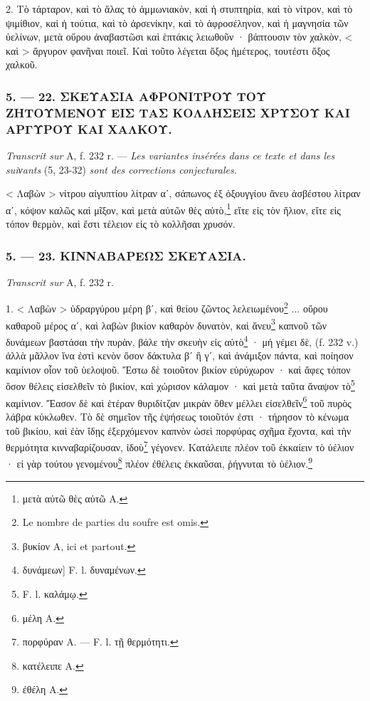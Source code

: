 \documentclass[a4paper, 11pt, oneside, polutonikogreek, french]{article}
\begin{document}
2. Τὸ τάρταρον, καὶ τὸ ἅλας τὸ ἀμμωνιακὸν, καὶ ἡ στυπτηρία, καὶ τὸ νίτρον, καὶ τὸ ψιμίθιον, καὶ ἡ τούτια, καὶ τὸ ἀρσενίκην, καὶ τὸ ἀφροσέληνον, καὶ ἡ μαγνησία τῶν ὑελίνων, μετὰ οὔρου ἀναβαστῶσι καὶ ἑπτάκις λειωθοῦν · βάπτουσιν τὸν χαλκὸν, < καὶ > ἄργυρον φανῆναι ποιεῖ. Καὶ τοῦτο λέγεται ὄξος ἡμέτερος, τουτέστι ὄξος χαλκοῦ.

\bigskip
\centerline{\EightStarTaper}
\centerline{\EightStarTaper\EightStarTaper}
\bigskip

\subsubsection{5. --- 22. ΣΚΕΥΑΣΙΑ ΑΦΡΟΝΙΤΡΟΥ ΤΟΥ ΖΗΤΟΥΜΕΝΟΥ ΕΙΣ ΤΑΣ ΚΟΛΛΗΣΕΙΣ ΧΡΥΣΟΥ ΚΑΙ ΑΡΓΥΡΟΥ ΚΑΙ ΧΑΛΚΟΥ.}

\emph{Transcrit sur} A, f. 232 r. --- \emph{Les variantes insérées dans ce texte et dans les suiνants} (5, 23-32) \emph{sont des corrections conjecturales.}

\bigskip

< Λαβὼν > νίτρου αἰγυπτίου λίτραν αʹ, σάπωνος ἐξ ὀξουγγίου ἄνευ ἀσβέστου λίτραν αʹ, κόψον καλῶς καὶ μῖξον, καὶ μετὰ αὐτῶν θὲς αὐτὸ,\footnote{μετὰ αὐτῶ θὲς αὐτῶ A.} εἴτε εἰς τὸν ἥλιον, εἴτε εἰς τόπον θερμὸν, καὶ ἔστι τέλειον εἰς τὸ κολλῆσαι χρυσόν.

\bigskip
\centerline{\EightStarTaper}
\centerline{\EightStarTaper\EightStarTaper}
\bigskip

\subsubsection{5. --- 23. ΚΙΝΝΑΒΑΡΕΩΣ ΣΚΕΥΑΣΙΑ.}

\emph{Transcrit sur} A, f. 232 r.

\bigskip

1. < Λαβὼν > ὑδραργύρου μέρη βʹ, καὶ θείου ζῶντος λελειωμένου\footnote{Le nombre de parties du soufre est omis.} ... οὔρου καθαροῦ μέρος αʹ, καὶ λαβὼν βικίον καθαρὸν δυνατὸν, καὶ ἄνευ\footnote{βυκίον A, ici et partout.} καπνοῦ τῶν δυνάμεων βαστάσαι τὴν πυρὰν, βάλε τὴν σκευὴν εἰς αὐτὸ\footnote{δυνάμεων] F. l. δυναμένων.} · μή γέμει δὲ, (f. 232 v.) ἀλλὰ μᾶλλον ἵνα ἐστὶ κενὸν ὅσον δάκτυλα βʹ ἢ γʹ, καὶ ἀνάμιξον πάντα, καὶ ποίησον καμίνιον οἷον τοῦ ὑελοψοῦ. Ἔστω δὲ τοιοῦτον βικίον εὐρύχωρον · καὶ ἄφες τόπον ὅσον θέλεις εἰσελθεῖν τὸ βικίον, καὶ χώρισον κάλαμον · καὶ μετὰ ταῦτα ἄναψον τὸ\footnote{F. l. καλάμῳ.} καμίνιον. Ἔασον δὲ καὶ ἑτέραν θυριδίτζαν μικρὰν ὅθεν μέλλει εἰσελθεῖν\footnote{μέλη A.} τοῦ πυρὸς λάβρα κύκλωθεν. Τὸ δὲ σημεῖον τῆς ἑψήσεως τοιοῦτόν ἐστι · τήρησον τὸ κένωμα τοῦ βικίου, καὶ ἐὰν ἴδῃς ἐξερχόμενον καπνὸν ὡσεὶ πορφύρας σχῆμα ἔχοντα, καὶ τὴν θερμότητα κινναβαρίζουσαν, ἰδοὺ\footnote{πορφύραν A. --- F. l. τῇ θερμότητι.} γέγονεν. Κατάλειπε πλέον τοῦ ἐκκαίειν τὸ ὑέλιον · εἰ γὰρ τούτου γενομένου\footnote{κατέλειπε A.} πλέον ἐθέλεις ἐκκαῦσαι, ῥήγνυται τὸ ὑέλιον.\footnote{ἐθέλη A.}
\end{document}
